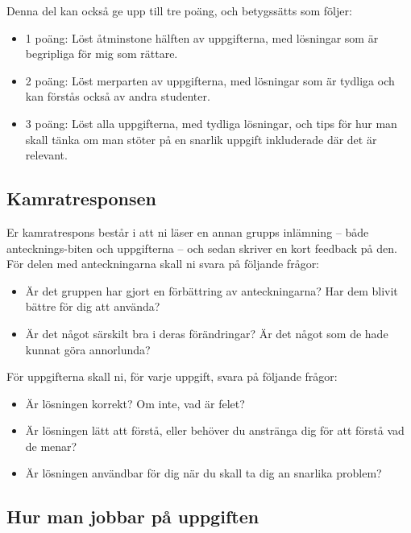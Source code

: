 \documentclass{tufte-handout}
\begin{document}
Denna del kan också ge upp till tre poäng, och betygssätts som följer:
\begin{itemize}
	\item 1 poäng: Löst åtminstone hälften av uppgifterna, med lösningar som är begripliga för mig som rättare.
	\item 2 poäng: Löst merparten av uppgifterna, med lösningar som är tydliga och kan förstås också av andra studenter.
	\item 3 poäng: Löst alla uppgifterna, med tydliga lösningar, och tips för hur man skall tänka om man stöter på en snarlik uppgift inkluderade där det är relevant.
\end{itemize}

\subsection{Kamratresponsen}

Er kamratrespons består i att ni läser en annan grupps inlämning -- både antecknings-biten och uppgifterna -- och sedan skriver en kort feedback på den. För delen med anteckningarna skall ni svara på följande frågor:
\begin{itemize}
	\item Är det gruppen har gjort en förbättring av anteckningarna? Har dem blivit bättre för dig att använda?
	\item Är det något särskilt bra i deras förändringar? Är det något som de hade kunnat göra annorlunda?
\end{itemize}
För uppgifterna skall ni, för varje uppgift, svara på följande frågor:
\begin{itemize}
	\item Är lösningen korrekt? Om inte, vad är felet?
	\item Är lösningen lätt att förstå, eller behöver du anstränga dig för att förstå vad de menar?
	\item Är lösningen användbar för dig när du skall ta dig an snarlika problem?
\end{itemize}

\subsection{Hur man jobbar på uppgiften}
\end{document}
